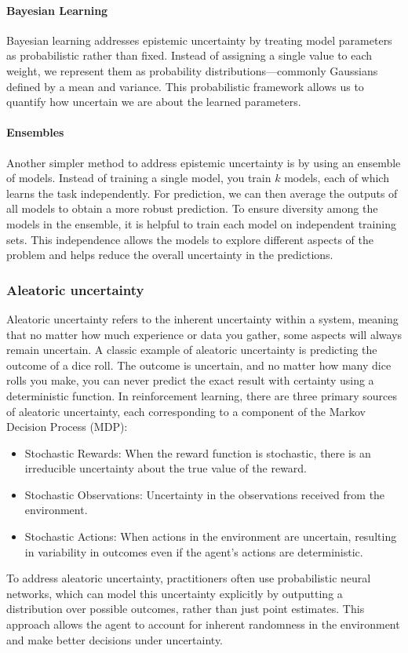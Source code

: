 \paragraph{Bayesian Learning}
Bayesian learning addresses epistemic uncertainty by treating model parameters as probabilistic rather than fixed. Instead of 
assigning a single value to each weight, we represent them as probability distributions—commonly Gaussians defined by a mean and 
variance. This probabilistic framework allows us to quantify how uncertain we are about the learned parameters. 

\paragraph{Ensembles}
Another simpler method to address epistemic uncertainty is by using an ensemble of models. 
Instead of training a single model, you train $k$ models, each of which learns the task 
independently. For prediction, we can then average the outputs of all models to obtain a 
more robust prediction.\newline
To ensure diversity among the models in the ensemble, it is helpful to train each model on 
independent training sets. This independence allows the models to explore different 
aspects of the problem and helps reduce the overall uncertainty in the predictions.

\subsubsection{ Aleatoric uncertainty}
Aleatoric uncertainty refers to the inherent uncertainty within a system, meaning that no 
matter how much experience or data you gather, some aspects will always remain uncertain. 
A classic example of aleatoric uncertainty is predicting the outcome of a dice roll. The 
outcome is uncertain, and no matter how many dice rolls you make, you can never predict 
the exact result with certainty using a deterministic function.\newline
In reinforcement learning, there are three primary sources of aleatoric uncertainty, each corresponding to a component of the Markov Decision Process (MDP):
\begin{itemize}
\item  Stochastic Rewards: When the reward function is stochastic, there is an irreducible 
uncertainty about the true value of the reward.
\item Stochastic Observations: Uncertainty in the observations received from the environment.
\item Stochastic Actions: When actions in the environment are uncertain, resulting in variability in outcomes even if the agent’s actions are deterministic.
\end{itemize}
To address aleatoric uncertainty, practitioners often use probabilistic neural networks, 
which can model this uncertainty explicitly by outputting a distribution over possible 
outcomes, rather than just point estimates. This approach allows the agent to account for 
inherent randomness in the environment and make better decisions under uncertainty.

